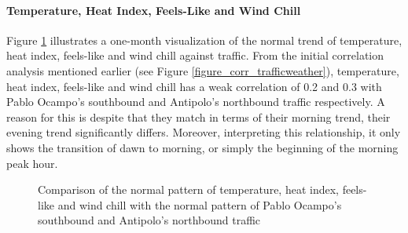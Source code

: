 \paragraph{Temperature, Heat Index, Feels-Like and Wind Chill}

Figure \ref{figure_traffic_vs_tempheatfeelswind} illustrates a one-month visualization of the normal trend of temperature, heat index, feels-like and wind chill against traffic. From the initial correlation analysis mentioned earlier (see Figure \ref{figure_corr_trafficweather}), temperature, heat index, feels-like and wind chill has a weak correlation of 0.2 and 0.3 with Pablo Ocampo’s southbound and Antipolo’s northbound traffic respectively. A reason for this is despite that they match in terms of their morning trend, their evening trend significantly differs. Moreover, interpreting this relationship, it only shows the transition of dawn to morning, or simply the beginning of the morning peak hour.


\begin{figure}[h] 
\centering
    \centering
      \captionsetup{justification=centering}
    \hfill
    \caption{Comparison of the normal pattern of temperature, heat index, feels-like and wind chill with the normal pattern of Pablo Ocampo’s southbound and Antipolo’s northbound traffic}

    \label{figure_traffic_vs_tempheatfeelswind}
\end{figure}


